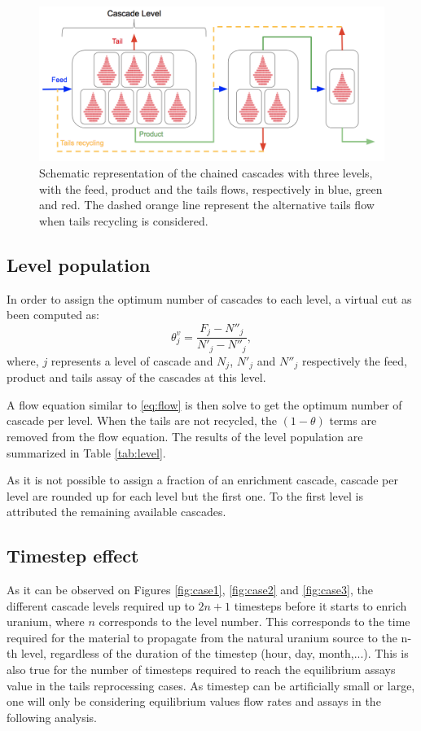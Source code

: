 \begin{figure}[ht] %
    \centering
    \includegraphics[scale=0.45]{flow}
    \caption{Schematic representation of the chained cascades with three levels,
    with the feed, product and the tails flows, respectively in blue, green and
    red. The dashed orange line represent the alternative tails flow when
    tails recycling is considered.}
    \label{fig:cascade_level}
\end{figure}


\subsection{Level population}
In order to assign the optimum number of cascades to each level, a virtual cut as
been computed as:
\begin{equation}
    \theta^{v}_{j} = \frac{F_{j}-N''_{j}}{N'_{j}-N''_{j}},
\end{equation}
where, $j$ represents a level of cascade and $N_{j}$, $N'_{j}$ and $N''_{j}$
respectively the feed, product and tails assay of the cascades at this level.

A flow equation similar to \eqref{eq:flow} is then solve to get the optimum
number of cascade per level. When the tails are not recycled, the $(1-\theta)$
terms are removed from the flow equation.  The results of the level population
are summarized in Table \ref{tab:level}.

As it is not possible to assign a fraction of an enrichment cascade, cascade per
level are rounded up for each level but the first one. To the first level is
attributed the remaining available cascades.


\subsection{Timestep effect}

As it can be observed on Figures \ref{fig:case1}, \ref{fig:case2} and
\ref{fig:case3}, the different cascade levels required up to $2n+1$ timesteps
before it starts to enrich uranium, where $n$ corresponds to the level number.
This corresponds to the time required for the material to propagate from the
natural uranium source to the n-th level, regardless of the duration of the
timestep (hour, day, month,...). This is also true for the number of timesteps
required to reach the equilibrium assays value in the tails reprocessing cases.
As timestep can be artificially small or large, one will only be considering
equilibrium values flow rates and assays in the following analysis.
